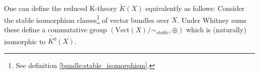 
    \begin{adefinition}
        One can define the reduced K-theory $\widetilde{K}(X)$ equivalently as follows: Consider the stable isomorphism classes\footnote{See definition \ref{bundle:stable_isomorphism}.} of vector bundles over $X$. Under Whitney sums these define a commutative group $(\text{Vect}(X)/\sim_{stable}, \oplus)$ which is (naturally) isomorphic to $\widetilde{K^0}(X)$.
    \end{adefinition}